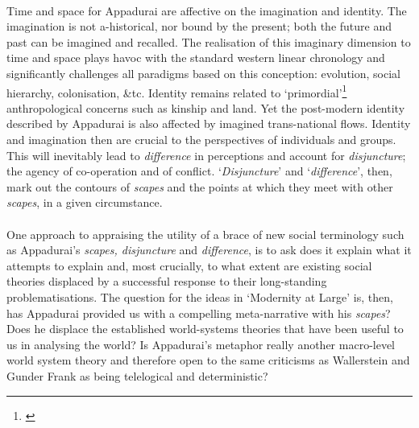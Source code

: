 \documentclass{article}
\begin{document}
\paragraph{}Time and space for Appadurai are affective on the imagination and identity. The imagination is not a-historical, nor bound by the present; both the future and past can be imagined and recalled. The realisation of this imaginary dimension to time and space plays havoc with the standard western linear chronology and significantly challenges all paradigms based on this conception: evolution, social hierarchy, colonisation, \&tc. Identity remains related to `primordial'\footnote{\cite[Ch .7]{Appadurai:1996lp}} anthropological concerns such as kinship and land. Yet the post-modern identity described by Appadurai is also affected by imagined trans-national flows. Identity and imagination then are crucial to the perspectives of individuals and groups. This will inevitably lead to \emph{difference} in perceptions and account for \emph{disjuncture}; the agency of co-operation and of conflict. `\emph{Disjuncture}' and `\emph{difference}', then, mark out the contours of  \emph{scapes} and the points at which they meet with other \emph{scapes}, in a given circumstance. 

\paragraph{}One approach to appraising the utility of a brace of new social terminology such as Appadurai's \emph{scapes, disjuncture} and \emph{difference}, is to ask does it explain what it attempts to explain and, most crucially, to what extent are existing social theories displaced by a successful response to their long-standing problematisations. The question for the ideas in `Modernity at Large' is, then, has Appadurai provided us with a compelling meta-narrative with his \emph{scapes}? Does he displace the established world-systems theories that have been useful to us in analysing the world? Is Appadurai's metaphor really another macro-level world system theory and therefore open to the same criticisms as Wallerstein and Gunder Frank as being telelogical and deterministic?
\end{document}

